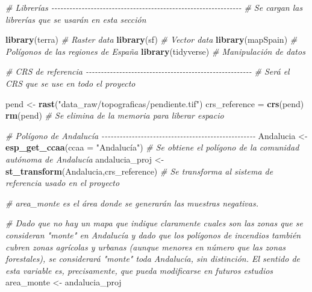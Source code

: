 \documentclass[12pt,a4paper,]{book}
\newenvironment{Shaded}{\begin{snugshade}}{\end{snugshade}}
\newcommand{\AttributeTok}[1]{\textcolor[rgb]{0.13,0.29,0.53}{#1}}
\newcommand{\CommentTok}[1]{\textcolor[rgb]{0.56,0.35,0.01}{\textit{#1}}}
\newcommand{\FunctionTok}[1]{\textcolor[rgb]{0.13,0.29,0.53}{\textbf{#1}}}
\newcommand{\NormalTok}[1]{#1}
\newcommand{\OtherTok}[1]{\textcolor[rgb]{0.56,0.35,0.01}{#1}}
\newcommand{\StringTok}[1]{\textcolor[rgb]{0.31,0.60,0.02}{#1}}
\numberwithin{dummy}{section}
\theoremstyle{ocrenumbox}
\theoremstyle{blacknumex}
\theoremstyle{blacknumbox}
\theoremstyle{ocrenum}
\theoremstyle{ocrenum}
\begin{document}
\begin{Shaded}
\begin{Highlighting}[]
\CommentTok{\# Librerías {-}{-}{-}{-}{-}{-}{-}{-}{-}{-}{-}{-}{-}{-}{-}{-}{-}{-}{-}{-}{-}{-}{-}{-}{-}{-}{-}{-}{-}{-}{-}{-}{-}{-}{-}{-}{-}{-}{-}{-}{-}{-}{-}{-}{-}{-}{-}{-}{-}{-}{-}{-}{-}{-}{-}{-}{-}{-}{-}{-}{-}{-}{-}}
\CommentTok{\# Se cargan las librerías que se usarán en esta sección}

\FunctionTok{library}\NormalTok{(terra) }\CommentTok{\# Raster data}
\FunctionTok{library}\NormalTok{(sf) }\CommentTok{\# Vector data}
\FunctionTok{library}\NormalTok{(mapSpain) }\CommentTok{\# Polígonos de las regiones de España}
\FunctionTok{library}\NormalTok{(tidyverse) }\CommentTok{\# Manipulación de datos}



\CommentTok{\# CRS de referencia {-}{-}{-}{-}{-}{-}{-}{-}{-}{-}{-}{-}{-}{-}{-}{-}{-}{-}{-}{-}{-}{-}{-}{-}{-}{-}{-}{-}{-}{-}{-}{-}{-}{-}{-}{-}{-}{-}{-}{-}{-}{-}{-}{-}{-}{-}{-}{-}{-}{-}{-}{-}{-}{-}{-}}
\CommentTok{\# Será el CRS que se use en todo el proyecto}

\NormalTok{pend }\OtherTok{\textless{}{-}} \FunctionTok{rast}\NormalTok{(}\StringTok{"data\_raw/topograficas/pendiente.tif"}\NormalTok{)}
\NormalTok{crs\_reference }\OtherTok{=} \FunctionTok{crs}\NormalTok{(pend)}
\FunctionTok{rm}\NormalTok{(pend) }\CommentTok{\# Se elimina de la memoria para liberar espacio}


\CommentTok{\# Polígono de Andalucía {-}{-}{-}{-}{-}{-}{-}{-}{-}{-}{-}{-}{-}{-}{-}{-}{-}{-}{-}{-}{-}{-}{-}{-}{-}{-}{-}{-}{-}{-}{-}{-}{-}{-}{-}{-}{-}{-}{-}{-}{-}{-}{-}{-}{-}{-}{-}{-}{-}{-}{-}}
\NormalTok{Andalucia }\OtherTok{\textless{}{-}} \FunctionTok{esp\_get\_ccaa}\NormalTok{(}\AttributeTok{ccaa =} \StringTok{"Andalucía"}\NormalTok{) }\CommentTok{\# Se obtiene el polígono de la comunidad autónoma de Andalucía}
\NormalTok{andalucia\_proj }\OtherTok{\textless{}{-}} \FunctionTok{st\_transform}\NormalTok{(Andalucia,crs\_reference) }\CommentTok{\# Se transforma al sistema de referencia usado en el proyecto}

\CommentTok{\# area\_monte es el área donde se generarán las muestras negativas.}

\CommentTok{\# Dado que no hay un mapa que indique claramente cuales son las zonas que se consideran "monte" en Andalucía y dado que los polígonos de incendios también cubren zonas agrícolas y urbanas (aunque menores en número que las zonas forestales), se considerará "monte" toda Andalucía, sin distinción. El sentido de esta variable es, precisamente, que pueda modificarse en futuros estudios}
\NormalTok{area\_monte }\OtherTok{\textless{}{-}}\NormalTok{ andalucia\_proj}


\end{Highlighting}
\end{Shaded}
\end{document}
